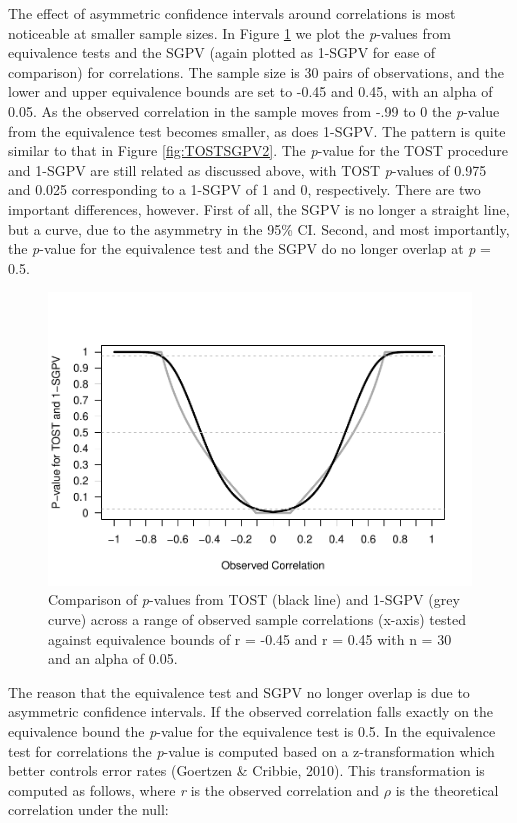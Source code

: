 \documentclass[,man,floatsintext]{apa6}
\begin{document}
The effect of asymmetric confidence intervals around correlations is most noticeable at smaller sample sizes. In Figure \ref{fig:TOSTSGPV11} we plot the \emph{p}-values from equivalence tests and the SGPV (again plotted as 1-SGPV for ease of comparison) for correlations. The sample size is 30 pairs of observations, and the lower and upper equivalence bounds are set to -0.45 and 0.45, with an alpha of 0.05. As the observed correlation in the sample moves from -.99 to 0 the \emph{p}-value from the equivalence test becomes smaller, as does 1-SGPV. The pattern is quite similar to that in Figure \ref{fig:TOSTSGPV2}. The \emph{p}-value for the TOST procedure and 1-SGPV are still related as discussed above, with TOST \emph{p}-values of 0.975 and 0.025 corresponding to a 1-SGPV of 1 and 0, respectively. There are two important differences, however. First of all, the SGPV is no longer a straight line, but a curve, due to the asymmetry in the 95\% CI. Second, and most importantly, the \emph{p}-value for the equivalence test and the SGPV do no longer overlap at \emph{p} = 0.5.

\begin{figure}
\centering
\includegraphics{manuscript.R2_files/figure-latex/TOSTSGPV11-1.pdf}
\caption{\label{fig:TOSTSGPV11}Comparison of \emph{p}-values from TOST (black line) and 1-SGPV (grey curve) across a range of observed sample correlations (x-axis) tested against equivalence bounds of r = -0.45 and r = 0.45 with n = 30 and an alpha of 0.05.}
\end{figure}

The reason that the equivalence test and SGPV no longer overlap is due to asymmetric confidence intervals. If the observed correlation falls exactly on the equivalence bound the \emph{p}-value for the equivalence test is 0.5. In the equivalence test for correlations the \emph{p}-value is computed based on a z-transformation which better controls error rates (Goertzen \& Cribbie, 2010). This transformation is computed as follows, where \emph{r} is the observed correlation and \(\rho\) is the theoretical correlation under the null:
\end{document}
